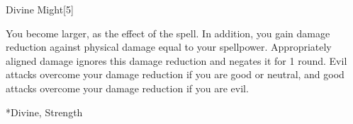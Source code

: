 \begin{spellsection}{Divine Might}[5]
    \begin{spellheader}
    \end{spellheader}
    \begin{spellcontent}
        \begin{spelltargetinginfo}
        \end{spelltargetinginfo}
        \begin{spelleffects}
            \spelleffect You become larger, as the effect of the  spell.
            In addition, you gain damage reduction against physical damage equal to your spellpower.
            Appropriately aligned damage ignores this damage reduction and negates it for 1 round.
            Evil attacks overcome your damage reduction if you are good or neutral, and good attacks overcome your damage reduction if you are evil.
            \spelldur \durshort \dismissable
        \end{spelleffects}
    \end{spellcontent}
    \begin{spellfooter}
        *{Divine, Strength}
        \spellnotes \sizingspellnotes
        \miscastexplode
    \end{spellfooter}
\end{spellsection}

